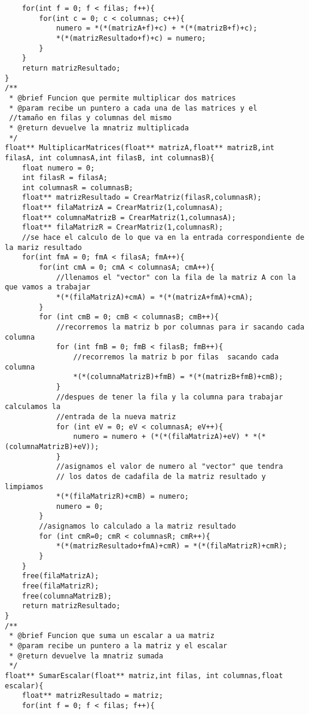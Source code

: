 \begin{verbatim}
    for(int f = 0; f < filas; f++){
        for(int c = 0; c < columnas; c++){
            numero = *(*(matrizA+f)+c) + *(*(matrizB+f)+c);
            *(*(matrizResultado+f)+c) = numero;
        }
    }
    return matrizResultado;
}
/**
 * @brief Funcion que permite multiplicar dos matrices
 * @param recibe un puntero a cada una de las matrices y el 
 //tamaño en filas y columnas del mismo
 * @return devuelve la mnatriz multiplicada
 */
float** MultiplicarMatrices(float** matrizA,float** matrizB,int filasA, int columnasA,int filasB, int columnasB){
    float numero = 0;
    int filasR = filasA;
    int columnasR = columnasB;
    float** matrizResultado = CrearMatriz(filasR,columnasR);
    float** filaMatrizA = CrearMatriz(1,columnasA);
    float** columnaMatrizB = CrearMatriz(1,columnasA);
    float** filaMatrizR = CrearMatriz(1,columnasR);
    //se hace el calculo de lo que va en la entrada correspondiente de la mariz resultado
    for(int fmA = 0; fmA < filasA; fmA++){
        for(int cmA = 0; cmA < columnasA; cmA++){
            //llenamos el "vector" con la fila de la matriz A con la que vamos a trabajar
            *(*(filaMatrizA)+cmA) = *(*(matrizA+fmA)+cmA);
        }
        for (int cmB = 0; cmB < columnasB; cmB++){
            //recorremos la matriz b por columnas para ir sacando cada columna
            for (int fmB = 0; fmB < filasB; fmB++){
                //recorremos la matriz b por filas  sacando cada columna
                *(*(columnaMatrizB)+fmB) = *(*(matrizB+fmB)+cmB);
            }
            //despues de tener la fila y la columna para trabajar calculamos la 
            //entrada de la nueva matriz
            for (int eV = 0; eV < columnasA; eV++){
                numero = numero + (*(*(filaMatrizA)+eV) * *(*(columnaMatrizB)+eV));
            }    
            //asignamos el valor de numero al "vector" que tendra
            // los datos de cadafila de la matriz resultado y limpiamos
            *(*(filaMatrizR)+cmB) = numero;
            numero = 0;
        }
        //asignamos lo calculado a la matriz resultado
        for (int cmR=0; cmR < columnasR; cmR++){            
            *(*(matrizResultado+fmA)+cmR) = *(*(filaMatrizR)+cmR);
        }
    }
    free(filaMatrizA);
    free(filaMatrizR);
    free(columnaMatrizB);
    return matrizResultado;
}
/**
 * @brief Funcion que suma un escalar a ua matriz
 * @param recibe un puntero a la matriz y el escalar
 * @return devuelve la mnatriz sumada
 */
float** SumarEscalar(float** matriz,int filas, int columnas,float escalar){
    float** matrizResultado = matriz;
    for(int f = 0; f < filas; f++){

\end{verbatim}
